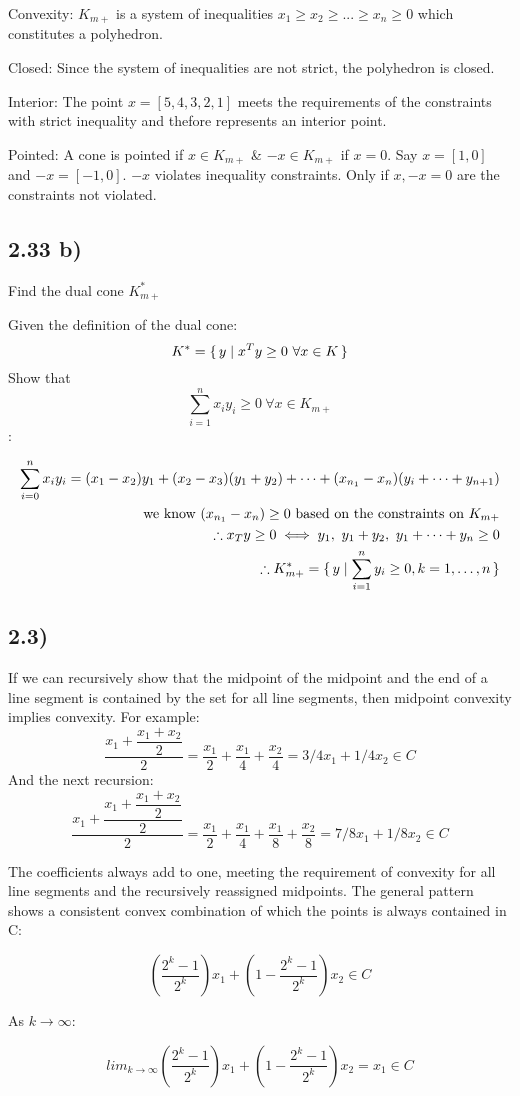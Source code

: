 \documentclass[12pt]{article}
\begin{document}
Convexity:
$K_{m+}$ is a system of inequalities $x_1 \ge x_2 \ge ... \ge x_n \ge 0$ which  constitutes a polyhedron.

Closed:
Since the system of inequalities are not strict, the polyhedron is closed.

Interior:
The point $x = [5, 4, 3, 2, 1]$ meets the requirements of the constraints with strict inequality and thefore represents an interior point.

Pointed:
A cone is pointed if $x \in K_{m+}$ \& $-x \in K_{m+}$ if $x = 0$.
Say $x = [1, 0]$ and $-x = [-1, 0]$. $-x$ violates inequality constraints. Only if $x, -x=0$ are the constraints not violated.


\subsection*{2.33 b)}
Find the dual cone $K_{m+}^*$

Given the definition of the dual cone:$$K^* = \set{y|x^Ty \ge 0\ \forall x \in K}$$ Show that $$\sum_{i=1}^{n}x_iy_i \ge 0\ \forall x \in K_{m+}$$:

\begin{align*}
\sum_{i=0}^{n}x_iy_i = (x_1 - x_2)y_1 + (x_2-x_3)(y_1 + y_2) + \dots + (x_{n_1}-x_n)(y_i + \dots + y_{n+1})\\
\text{we know $(x_{n_1}-x_n) \ge 0$ based on the constraints on $K_{m+}$}\\
\therefore x_Ty \ge 0 \iff y_1,\ y_1+y_2,\ y_1 + \dots + y_n \ge 0\\
\therefore K^*_{m+} = \set{y | \sum_{i=1}^{n} y_i \ge 0, k=1, \dots, n}
\end{align*}

\subsection*{2.3)}
If we can recursively show that the midpoint of the midpoint and the end of a line segment is contained by the set for all line segments, then midpoint convexity implies convexity.
For example:
$$\dfrac{x_1+\dfrac{x_1+x_2}{2}}{2} = \dfrac{x_1}{2}+\dfrac{x_1}{4}+\dfrac{x_2}{4} = 3/4x_1 + 1/4x_2\in C$$
And the next recursion:
$$\dfrac{x_1+\dfrac{x_1+\dfrac{x_1+x_2}{2}}{2}}{2} = \dfrac{x_1}{2}+\dfrac{x_1}{4}+\dfrac{x_1}{8} +\dfrac{x_2}{8} = 7/8x_1 +1/8x_2\in C$$

The coefficients always add to one, meeting the requirement of convexity for all line segments and the recursively reassigned midpoints. The general pattern shows a consistent convex combination of which the points is always contained in C:

$$(\dfrac{2^k-1}{2^k})x_1 +(1 - \dfrac{2^k-1}{2^k})x_2\in C$$

As $k \rightarrow \infty$:

$$lim_{k \rightarrow \infty} (\dfrac{2^k-1}{2^k})x_1 +(1 - \dfrac{2^k-1}{2^k})x_2 = x_1 \in C$$


 
\end{document}

